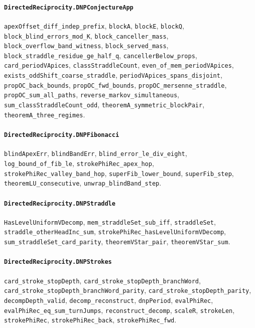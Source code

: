 \paragraph{\texttt{DirectedReciprocity.DNPConjectureApp}}
{\small\raggedright \texttt{apexOffset\_diff\_indep\_prefix}, \texttt{blockA}, \texttt{blockE}, \texttt{blockQ}, \texttt{block\_blind\_errors\_mod\_K}, \texttt{block\_canceller\_mass}, \texttt{block\_overflow\_band\_witness}, \texttt{block\_served\_mass}, \texttt{block\_straddle\_residue\_ge\_half\_q}, \texttt{cancellerBelow\_props}, \texttt{card\_periodVApices}, \texttt{classStraddleCount}, \texttt{even\_of\_mem\_periodVApices}, \texttt{exists\_oddShift\_coarse\_straddle}, \texttt{periodVApices\_spans\_disjoint}, \texttt{propOC\_back\_bounds}, \texttt{propOC\_fwd\_bounds}, \texttt{propOC\_mersenne\_straddle}, \texttt{propOC\_sum\_all\_paths}, \texttt{reverse\_markov\_simultaneous}, \texttt{sum\_classStraddleCount\_odd}, \texttt{theoremA\_symmetric\_blockPair}, \texttt{theoremA\_three\_regimes}.\par}

\paragraph{\texttt{DirectedReciprocity.DNPFibonacci}}
{\small\raggedright \texttt{blindApexErr}, \texttt{blindBandErr}, \texttt{blind\_error\_le\_div\_eight}, \texttt{log\_bound\_of\_fib\_le}, \texttt{strokePhiRec\_apex\_hop}, \texttt{strokePhiRec\_valley\_band\_hop}, \texttt{superFib\_lower\_bound}, \texttt{superFib\_step}, \texttt{theoremLU\_consecutive}, \texttt{unwrap\_blindBand\_step}.\par}

\paragraph{\texttt{DirectedReciprocity.DNPStraddle}}
{\small\raggedright \texttt{HasLevelUniformVDecomp}, \texttt{mem\_straddleSet\_sub\_iff}, \texttt{straddleSet}, \texttt{straddle\_otherHeadInc\_sum}, \texttt{strokePhiRec\_hasLevelUniformVDecomp}, \texttt{sum\_straddleSet\_card\_parity}, \texttt{theoremVStar\_pair}, \texttt{theoremVStar\_sum}.\par}

\paragraph{\texttt{DirectedReciprocity.DNPStrokes}}
{\small\raggedright \texttt{card\_stroke\_stopDepth}, \texttt{card\_stroke\_stopDepth\_branchWord}, \texttt{card\_stroke\_stopDepth\_branchWord\_parity}, \texttt{card\_stroke\_stopDepth\_parity}, \texttt{decompDepth\_valid}, \texttt{decomp\_reconstruct}, \texttt{dnpPeriod}, \texttt{evalPhiRec}, \texttt{evalPhiRec\_eq\_sum\_turnJumps}, \texttt{reconstruct\_decomp}, \texttt{scaleR}, \texttt{strokeLen}, \texttt{strokePhiRec}, \texttt{strokePhiRec\_back}, \texttt{strokePhiRec\_fwd}.\par}

